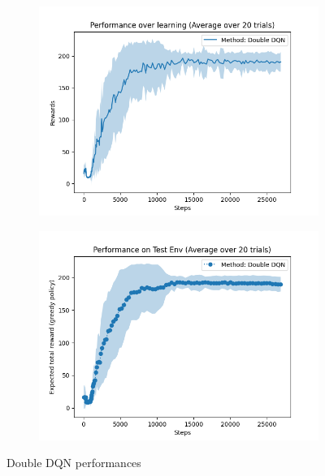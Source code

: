 \documentclass[a4paper]{article}
\begin{document}
\begin{figure}[h!]
    \centering
    \begin{subfigure}[b]{0.4\linewidth}
        \includegraphics[width=\linewidth]{images/ddqn_l}
    \end{subfigure}
    \begin{subfigure}[b]{0.4\linewidth}
        \includegraphics[width=\linewidth]{images/ddqn_t}
    \end{subfigure}
    \caption{Double DQN performances}
    \label{fig:ddqn}
\end{figure}
\end{document}
